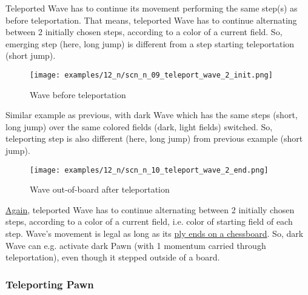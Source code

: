 Teleported Wave has to continue its movement performing the same step(s) as
before teleportation. That means, teleported Wave has to continue alternating
between 2 initially chosen steps, according to a color of a current field. So,
emerging step (here, long jump) is different from a step starting teleportation
(short jump).

\clearpage %

\noindent
\begin{figure}[!h]
\texttt{[image: examples/12\_n/scn\_n\_09\_teleport\_wave\_2\_init.png]}
\caption{Wave before teleportation}
\label{fig:scn_n_09_teleport_wave_2_init}
\end{figure}

Similar example as previous, with dark Wave which has the same steps (short,
long jump) over the same colored fields (dark, light fields) switched. So,
teleporting step is also different (here, long jump) from previous example
(short jump).

\clearpage %

\noindent
\begin{figure}[!h]
\texttt{[image: examples/12\_n/scn\_n\_10\_teleport\_wave\_2\_end.png]}
\caption{Wave out-of-board after teleportation}
\label{fig:scn_n_10_teleport_wave_2_end}
\end{figure}

\hyperref[fig:scn_n_08_teleport_wave_end]{Again},
teleported Wave has to continue alternating between 2 initially chosen steps,
according to a color of a current field, i.e. color of starting field of each
step. Wave's movement is legal as long as its
\hyperref[fig:scn_mv_28_wave_off_board]{ply ends on a chessboard}. So, dark
Wave can e.g. activate dark Pawn (with 1 momentum carried through teleportation),
even though it stepped outside of a board.

\clearpage %

\subsubsection*{Teleporting Pawn}


